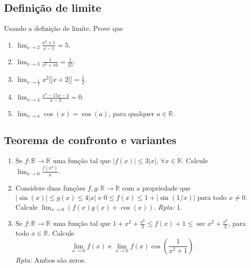 \documentclass[latin,20pt]{article}
\begin{document}
    \subsection{Definição de limite}   
   Usando a definição de limite. Prove que 
    \begin{enumerate}
    \item $\lim_{x \rightarrow 2} \frac{x^2+1}{x-1}=5$.
    \item $\lim_{x \rightarrow 3} 
    \frac{1}{x^2+16}=\frac{1}{25}$. 
    \item $\lim_{x \rightarrow \frac{1}{2}} x^{2}\lbrack\!\lbrack x+2 \rbrack\!\rbrack=\frac{1}{2}$. 
    \item  $\lim_{x \rightarrow 4} 
    \frac{x^3-15x-4}{x-3}=0$.
    \item $\lim_{x \rightarrow a}\cos(x)=\cos(a)$, para qualquer $a \in \mathbb{R}$.  
    \end{enumerate}
     \subsection{Teorema de confronto e variantes}   
    \begin{enumerate}
    \item Se $f:\mathbb{R}\rightarrow \mathbb{R}$ uma função tal que $|f(x)|\leq 3|x|$, $\forall x \in \mathbb{R}$.
    Calcule $\lim_{x \rightarrow 0} \frac{f(x^3)}{x}$.
    \item Considere duas funções 
    $f,g:\mathbb{R}\rightarrow \mathbb{R}$ com a propriedade que $|\sin(x)|\leq g(x)\leq 4|x|$ e 
    $0 \leq f(x)\leq 1+|\sin(1/x)|$ para todo $x \neq 0$. 
    Calcule $\lim_{x \rightarrow 0} (f(x)g(x)+\cos(x))$.
    {\it Rpta: } 1.
    \item Se $f:\mathbb{R}\rightarrow \mathbb{R}$ uma função tal que $1+x^2+\frac{x^6}{3}\leq f(x)+ 1 \leq 
    \sec{x^2}+\frac{x^6}{3}$, para todo $x \in \mathbb{R}$. Calcule
    $$
    \lim_{x\rightarrow 0}f(x) \text{ e } 
    \lim_{x\rightarrow 0}f(x)\cos\left(\frac{1}{x^2+1}\right).
    $$ {\it Rpta: } Ambos são zeros. 
    \end{enumerate}
\end{document}
